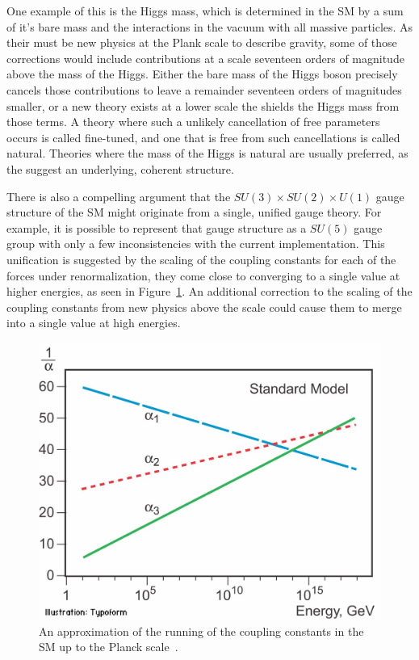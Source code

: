 One example of this is the Higgs mass, which is determined in the \ac{SM} by a sum of it's bare mass and the interactions in the vacuum with all massive particles.
As their must be new physics at the Plank scale to describe gravity, some of those corrections would include contributions at a scale seventeen orders of magnitude above the mass of the Higgs.
Either the bare mass of the Higgs boson precisely cancels those contributions to leave a remainder seventeen orders of magnitudes smaller, or a new theory exists at a lower scale the shields the Higgs mass from those terms.
A theory where such a unlikely cancellation of free parameters occurs is called fine-tuned, and one that is free from such cancellations is called natural.
Theories where the mass of the Higgs is natural are usually preferred, as the suggest an underlying, coherent structure.

There is also a compelling argument that the $SU(3)\times SU(2) \times U(1)$ gauge structure of the \ac{SM} might originate from a single, unified gauge theory.
For example, it is possible to represent that gauge structure as a $SU(5)$ gauge group with only a few inconsistencies with the current implementation.
This unification is suggested by the scaling of the coupling constants for each of the forces under renormalization, they come close to converging to a single value at higher energies, as seen in Figure~\ref{fig:unification_sm}. 
An additional correction to the scaling of the coupling constants from new physics above the \TeV scale could cause them to merge into a single value at high energies. 

\begin{figure}
\includegraphics[width=\fullfig]{figures/unification_sm.jpg}
\caption{An approximation of the running of the coupling constants in the \ac{SM} up to the Planck scale~\cite{unification_plot}.}
\label{fig:unification_sm}
\end{figure}

